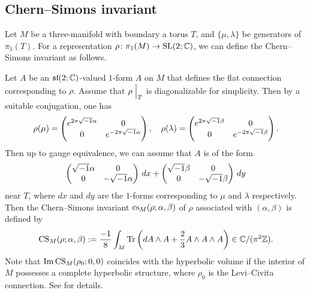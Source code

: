 \subsection{Chern--Simons invariant}
Let $M$ be a three-manifold with boundary a torus $T$, and $\{\mu,\lambda\}$ be generators of $\pi_1(T)$.
For a representation $\rho\colon\pi_1(M)\to\rm{SL}(2;\mathbb{C})$, we can define the Chern--Simons invariant as follows.
\par
Let $A$ be an $\mathfrak{sl}(2;\mathbb{C})$-valued $1$-form $A$ on $M$ that defines the flat connection corresponding to $\rho$.
Assume that $\rho\Bigm|_{T}$ is diagonalizable for simplicity.
Then by a suitable conjugation, one has
\begin{equation*}
  \rho(\mu)
  =
  \begin{pmatrix}
    e^{2\pi\sqrt{-1}\alpha}& 0               \\
    0               & e^{-2\pi\sqrt{-1}\alpha}
  \end{pmatrix},
  \quad
  \rho(\lambda)
  =
  \begin{pmatrix}
    e^{2\pi\sqrt{-1}\beta}& 0               \\
    0              &e^{-2\pi\sqrt{-1}\beta}
  \end{pmatrix}.
\end{equation*}
Then up to gauge equivalence, we can assume that $A$ is of the form
\begin{equation*}
  \begin{pmatrix}
    \sqrt{-1}\alpha& 0       \\
    0       & -\sqrt{-1}\alpha
  \end{pmatrix}
  \,dx
  +
  \begin{pmatrix}
    \sqrt{-1}\beta& 0      \\
    0      &-\sqrt{-1}\beta
  \end{pmatrix}
  \,dy
\end{equation*}
near $T$, where $dx$ and $dy$ are the $1$-forms corresponding to $\mu$ and $\lambda$ respectively.
Then the Chern--Simons invariant $\operatorname{cs}_{M}(\rho;\alpha,\beta)$ of $\rho$ associated with $(\alpha,\beta)$ is defined by
\begin{equation*}
  \operatorname{CS}_{M}(\rho;\alpha,\beta)
  :=
  \frac{-1}{8}
  \int_{M}\operatorname{Tr}\left(dA\wedge A+\frac{2}{3}A\wedge A\wedge A\right)\in\mathbb{C}/(\pi^2\mathbb{Z}).
\end{equation*}
Note that $\operatorname{Im}\operatorname{CS}_{M}(\rho_0;0,0)$ coincides with the hyperbolic volume if the interior of $M$ possesses a complete hyperbolic structure, where $\rho_0$ is the Levi--Civita connection.
See \cite{Kirk/Klassen:COMMP1993} for details.
\par
